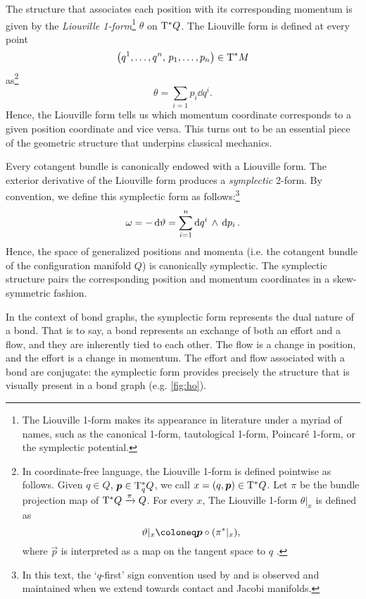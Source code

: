 The structure that associates each position with its corresponding momentum is given by the \emph{Liouville 1-form}\footnote
{
    The Liouville 1-form makes its appearance in literature under a myriad of names, such as the canonical 1-form, tautological 1-form, Poincaré 1-form, or the symplectic potential.
}
\(\theta\) on \(\mathrm{T}^*Q\). The Liouville form is defined at every point 
\[ \qty(q^1, \ldots, q^n,\, p_1, \ldots, p_n) \in \mathrm{T}^*M \] 
as\footnote
{
    In coordinate-free language, the Liouville 1-form is defined pointwise as follows. Given $q \in Q$, $\vec{p} \in \ctspace{q}{Q}$, we call $x = (q, \vec{p}) \in \ctbundle{Q}$. Let $\pi$ be the bundle projection map of $\mathrm{T}^*Q\xrightarrow[]{\pi}Q$. For every $x$, The Liouville 1-form $\theta\vert_x$ is defined as
    \begin{equation}
        \theta\vert_x \coloneq \vec{p} \circ \qty(\pi^*\vert_x),
    \end{equation}
    where $\vec{p}$ is interpreted as a map on the tangent space to $q$ \cite{Cannas2001}.
}
\begin{equation}
    \theta = \sum_{i = 1} p_i\dd{q^i}.
\end{equation}
Hence, the Liouville form tells us which momentum coordinate corresponds to a given position coordinate and vice versa. This turns out to be an essential piece of the geometric structure that underpins classical mechanics.

Every cotangent bundle is canonically endowed with a Liouville form. The exterior derivative of the Liouville form produces a \emph{symplectic} 2-form. By convention, we define this symplectic form as follows:\footnote
{
    In this text, the `\(q\)-first' sign convention used by \citet{Abraham1978} and \citet{Cannas2001} is observed and maintained when we extend towards contact and Jacobi manifolds.
}
\begin{equation}
     \omega = -\dd{\vartheta} = \sum_{i = 1}^n  \dd{q^i}\,\wedge\,\dd{p_i} .
\end{equation}
Hence, the space of generalized positions and momenta (i.e. the cotangent bundle of the configuration manifold \(Q\)) is canonically symplectic. The symplectic structure pairs the corresponding position and momentum coordinates in a skew-symmetric fashion.

In the context of bond graphs, the symplectic form represents the dual nature of a bond. That is to say, a bond represents an exchange of both an effort and a flow, and they are inherently tied to each other. The flow is a change in position, and the effort is a change in momentum. The effort and flow associated with a bond are conjugate: the symplectic form provides precisely the structure that is visually present in a bond graph (e.g. \cref{fig:ho}).

